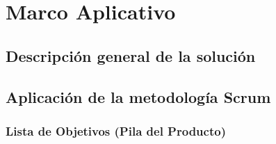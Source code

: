 \chapter{Marco Aplicativo}


\section{Descripción general de la solución} 
\setlength{\parskip}{5mm}
\setlength{\parskip}{0mm}


\section{Aplicación de la metodología Scrum}

\subsection{Lista de Objetivos (Pila del Producto)}
\setlength{\parskip}{5mm}


